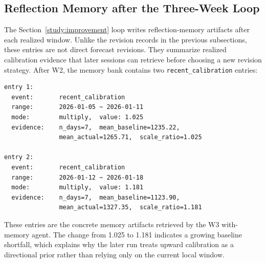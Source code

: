 \documentclass{article}
\theoremstyle{plain}
\theoremstyle{definition}
\theoremstyle{remark}
\begin{document}
\subsection{Reflection Memory after the Three-Week Loop}\label{app:reflection_memory}

The Section~\ref{study:improvement} loop writes reflection-memory artifacts after each realized window. Unlike the revision records in the previous subsections, these entries are not direct forecast revisions. They summarize realized calibration evidence that later sessions can retrieve before choosing a new revision strategy. After W2, the memory bank contains two \texttt{recent\_calibration} entries:

\begin{lstlisting}[caption={Reflection memory entries after W2}, label={lst:case_study_6_4_memory}]
entry 1:
  event:       recent_calibration
  range:       2026-01-05 ~ 2026-01-11
  mode:        multiply,  value: 1.025
  evidence:    n_days=7,  mean_baseline=1235.22,
               mean_actual=1265.71,  scale_ratio=1.025

entry 2:
  event:       recent_calibration
  range:       2026-01-12 ~ 2026-01-18
  mode:        multiply,  value: 1.181
  evidence:    n_days=7,  mean_baseline=1123.90,
               mean_actual=1327.35,  scale_ratio=1.181
\end{lstlisting}

These entries are the concrete memory artifacts retrieved by the W3 with-memory agent. The change from 1.025 to 1.181 indicates a growing baseline shortfall, which explains why the later run treats upward calibration as a directional prior rather than relying only on the current local window.
\end{document}

